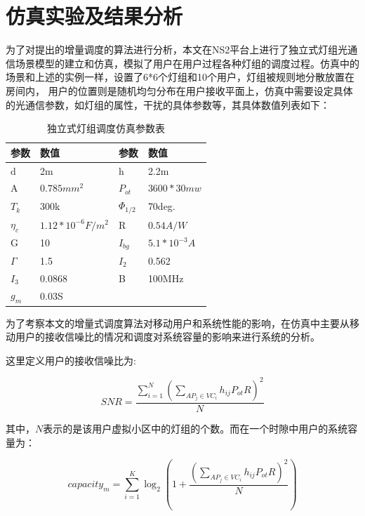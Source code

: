 \section{仿真实验及结果分析}\label{sec:iss-simulatioon-result}
为了对提出的增量调度的算法进行分析，本文在NS2平台上进行了独立式灯组光通信场景模型的建立和仿真，模拟了用户在用户过程各种灯组的调度过程。仿真中的场景和上述的实例一样，设置了6*6个灯组和10个用户，灯组被规则地分散放置在房间内，
用户的位置则是随机均匀分布在用户接收平面上，仿真中需要设定具体的光通信参数，如灯组的属性，干扰的具体参数等，其具体数值列表如下：

\begin{table}[htbp]
    \caption{独立式灯组调度仿真参数表}
    \label{tab:iss-simulation-param}
    \centering
    \begin{tabular}{llll}
        \toprule
        参数     & 数值 & 参数 & 数值 \\
        \midrule
        d        & 2m                & h           & 2.2m \\
        A        & $0.785mm^{2}$       & $P_{ot}$      & $3600*30mw$ \\
        $T_{k}$    & 300k              & $\Phi_{1/2}$  & 70deg. \\
        $\eta_{c}$ & $1.12*10^{-6}F/m^2$ & R           & $0.54A/W$\\
        G        & 10                & $I_{bg}$      & $5.1*10^{-3}A$ \\
        $\Gamma$   & 1.5               & $I_{2}$       & 0.562 \\
        $I_{3}$    & 0.0868            & B           & 100MHz \\
        $g_m$      & 0.03S \\
        \bottomrule
    \end{tabular}
\end{table}

为了考察本文的增量式调度算法对移动用户和系统性能的影响，在仿真中主要从移动用户的接收信噪比的情况和调度对系统容量的影响来进行系统的分析。

这里定义用户的接收信噪比为:

\begin{equation}
    SNR = \frac{{\sum\limits_{i = 1}^N {{{(\sum\limits_{A{P_j} \in V{C_i}} {{h_{ij}}{P_{ot}}R} )}^2}} }}{N}
\end{equation}

其中，$N$表示的是该用户虚拟小区中的灯组的个数。而在一个时隙中用户的系统容量为：

\begin{equation}
    capacit{y_m} = \sum\limits_{i = 1}^K {{{\log }_2}(1 + \frac{{{{(\sum\limits_{A{P_j} \in V{C_i}} {{h_{ij}}{P_{ot}}R} )}^2}}}{N})}
\end{equation}

